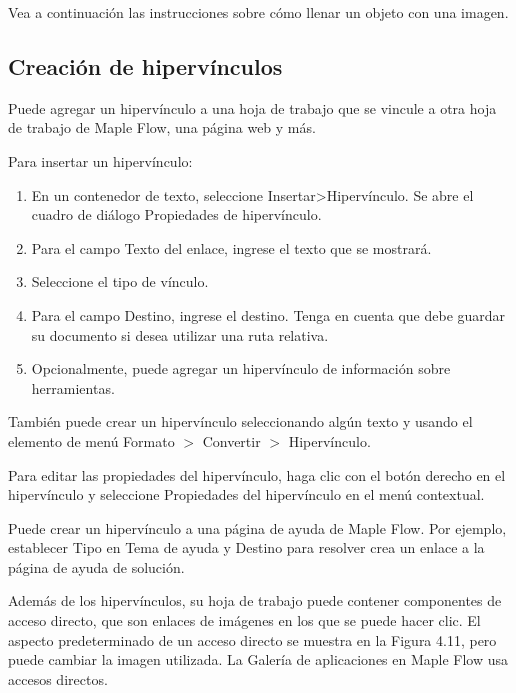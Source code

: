 


Vea a continuación las instrucciones sobre cómo llenar un objeto con una imagen.

\subsection{Creación de hipervínculos}
Puede agregar un hipervínculo a una hoja de trabajo que se vincule a otra hoja de trabajo de Maple Flow, una página web y más.

Para insertar un hipervínculo:

\begin{enumerate}
	\item En un contenedor de texto, seleccione Insertar>Hipervínculo. Se abre el cuadro de diálogo Propiedades de hipervínculo.
	
	\item Para el campo Texto del enlace, ingrese el texto que se mostrará.
	
	\item Seleccione el tipo de vínculo.
	
	\item Para el campo Destino, ingrese el destino. Tenga en cuenta que debe guardar su documento si desea utilizar una ruta relativa.
	
	\item Opcionalmente, puede agregar un hipervínculo de información sobre herramientas.
	
\end{enumerate}

También puede crear un hipervínculo seleccionando algún texto y usando el elemento de menú Formato $>$ Convertir $>$ Hipervínculo.

Para editar las propiedades del hipervínculo, haga clic con el botón derecho en el hipervínculo y seleccione Propiedades del hipervínculo en el menú contextual.

Puede crear un hipervínculo a una página de ayuda de Maple Flow. Por ejemplo, establecer Tipo en Tema de ayuda y Destino para resolver crea un enlace a la página de ayuda de solución.



Además de los hipervínculos, su hoja de trabajo puede contener componentes de acceso directo, que son enlaces de imágenes en los que se puede hacer clic. El aspecto predeterminado de un acceso directo se muestra en la Figura 4.11, pero puede cambiar la imagen utilizada. La Galería de aplicaciones en Maple Flow usa accesos directos.

